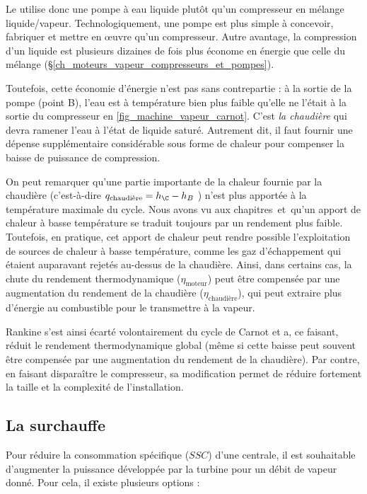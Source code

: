 		Le  utilise donc une pompe à eau liquide plutôt qu’un compresseur en mélange liquide/vapeur. Technologiquement, une pompe est plus simple à concevoir, fabriquer et mettre en œuvre qu’un compresseur. Autre avantage, la compression d’un liquide est plusieurs dizaines de fois plus économe en énergie que celle du mélange (\S\ref{ch_moteurs_vapeur_compresseurs_et_pompes}). 
		
		Toutefois, cette économie d’énergie n’est pas sans contrepartie : à la sortie de la pompe (point B), l’eau est à température bien plus faible qu’elle ne l’était à la sortie du compresseur en \cref{fig_machine_vapeur_carnot}. C’est \emph{la chaudière} qui devra ramener l’eau à l’état de liquide saturé. Autrement dit, il faut fournir une dépense supplémentaire considérable sous forme de chaleur pour compenser la baisse de puissance de compression.

		On peut remarquer qu’une partie importante de la chaleur fournie par la chaudière (c’est-à-dire $q_\text{chaudière} = h_\C - h_B$ ) n’est plus apportée à la température maximale du cycle. Nous avons vu aux chapitres~\sept et~\huit qu’un apport de chaleur à basse température se traduit toujours par un rendement plus faible.\\
		Toutefois, en pratique, cet apport de chaleur peut rendre possible l’exploitation de sources de chaleur à basse température, comme les gaz d’échappement qui étaient auparavant rejetés au-dessus de la chaudière. Ainsi, dans certains cas, la chute du rendement thermodynamique ($\eta_\text{moteur}$) peut être compensée par une augmentation du rendement de la chaudière ($\eta_\text{chaudière}$), qui peut extraire plus d’énergie au combustible pour le transmettre à la vapeur.
		
		Rankine s’est ainsi écarté volontairement du cycle de Carnot et a, ce faisant, réduit le rendement thermodynamique global (même si cette baisse peut souvent être compensée par une augmentation du rendement de la chaudière). Par contre, en faisant disparaître le compresseur, sa modification permet de réduire fortement la taille et la complexité de l’installation.

		 

	\subsection{La surchauffe}

		Pour réduire la consommation spécifique ($SSC$) d’une centrale, il est souhaitable d’augmenter la puissance développée par la turbine pour un débit de vapeur donné. Pour cela, il existe plusieurs options :

